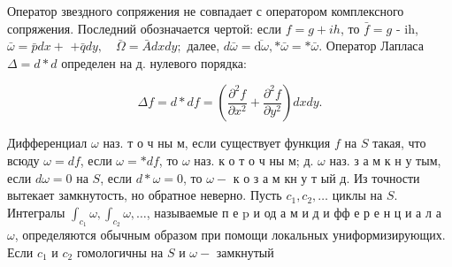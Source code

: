 \documentclass[10pt]{article}
\begin{document}
Оператор звездного сопряжения не совпадает с оператором комплексного сопряжения. Последний обозначается чертой: если $f=g+i h$, то $\bar{f}=g$ - ih, $\bar{\omega}=\bar{p} d x+$ $+\bar{q} d y, \quad \bar{\Omega}=\bar{A} d x d y ;$ далее, $d \bar{\omega}=\overline{\mathrm{d} \omega}, * \bar{\omega}=* \bar{\omega}$. Оператор Лапласа $\Delta=d * d$ определен на д. нулевого порядка:



\[

\Delta f=d * d f=\left(\frac{\partial^{2} f}{\partial x^{2}}+\frac{\partial^{2} f}{\partial y^{2}}\right) d x d y .

\]



Дифференциал $\omega$ наз. т о ч ны м, если существует функция $f$ на $S$ такая, что всюду $\omega=d f$, если $\omega=* d f$, то $\omega$ наз. к о т о ч ны м; д. $\omega$ наз. з а м к н у тым, если $d \omega=0$ на $S$, если $d * \omega=0$, то $\omega-$ к о з а м кн у т ый д. Из точности вытекает замкнутость, но обратное неверно. Пусть $c_{1}, c_{2}, \ldots$ циклы на $S$. Интегралы $\int_{c_{1}} \omega, \int_{c_{2}} \omega, \ldots$, называемые п е $\mathrm{p}$ и од а м и д и фф е р е н ц и а л а $\omega$, определяются обычным образом при помощи локальных униформизирующих. Если $c_{1}$ и $c_{2}$ гомологичны на $S$ и $\omega-$ замкнутый
\end{document}
